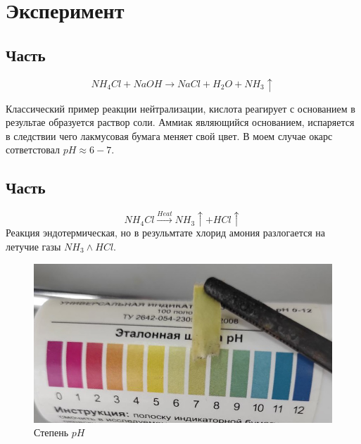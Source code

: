 \section{Эксперимент}
\subsection{Часть}
\begin{equation}
    NH_4Cl + NaOH \to NaCl + H_2O + NH_3 \uparrow
\end{equation}

Классический пример реакции нейтрализации, кислота реагирует
с основанием в результае образуется раствор соли. Аммиак 
являющийся основанием, испаряется в следствии чего лакмусовая 
бумага меняет свой цвет. В моем случае окарс сответстовал 
$pH \approx 6-7$.



\subsection{Часть}
\begin{equation}
    NH_4Cl \xrightarrow{Heat} NH_3\uparrow + HCl\uparrow
\end{equation}
Реакция эндотермическая, но в резульмтате хлорид амония 
разлогается на летучие газы $NH_3 \land HCl$.

\begin{figure}[h]
    \centering
    \includegraphics[width=1\linewidth]{Ex_4/2.jpg}
     \caption{Степень $pH$}
    \label{ex_4_2}
\end{figure}




